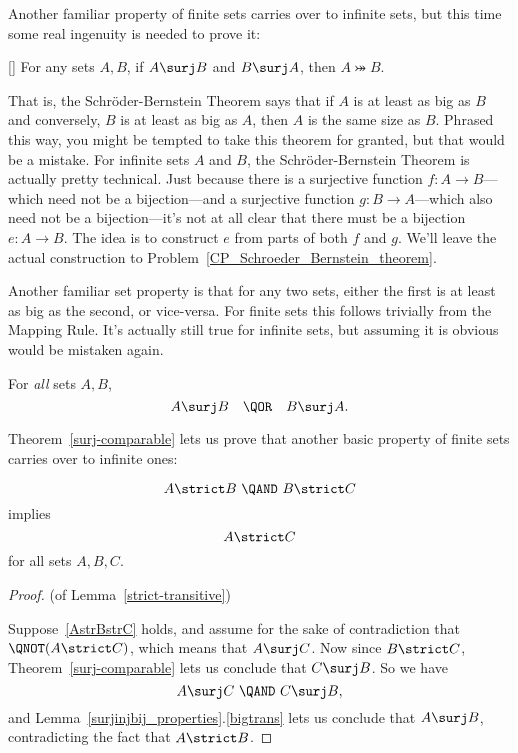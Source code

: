 Another familiar property of finite sets carries over to infinite
sets, but this time some real ingenuity is needed to prove it:
\begin{theorem}\label{S-B_thm} \mbox{}
 [] For any sets $A,B$, if $A \surj B$ and
 $B \surj A$, then $A \bij B$.
\end{theorem}

That is, the Schr\"oder-Bernstein Theorem says that if $A$ is at least
as big as $B$ and conversely, $B$ is at least as big as $A$, then $A$
is the same size as $B$.  Phrased this way, you might be tempted to
take this theorem for granted, but that would be a mistake.  For
infinite sets $A$ and $B$, the Schr\"oder-Bernstein Theorem is
actually pretty technical.  Just because there is a surjective
function $f:A\to B$---which need not be a bijection---and a surjective
function $g:B \to A$---which also need not be a bijection---it's not
at all clear that there must be a bijection $e:A \to B$.  The idea is
to construct $e$ from parts of both $f$ and $g$.  We'll leave the
actual construction to Problem~\ref{CP_Schroeder_Bernstein_theorem}.

Another familiar set property is that for any two sets, either the
first is at least as big as the second, or vice-versa.  For finite
sets this follows trivially from the Mapping Rule.  It's actually
still true for infinite sets, but assuming it is obvious would be
mistaken again.
  \begin{theorem}\label{surj-comparable}
    For \emph{all} sets $A,B$,
    \[
    A \surj B\quad \QOR\quad  B \surj A.
    \]
  \end{theorem}

Theorem~\ref{surj-comparable} lets us prove that another basic
property of finite sets carries over to infinite ones:
\begin{lemma}\label{strict-transitive}
\begin{equation}\label{AstrBstrC}
A \strict B\ \QAND\ B \strict C
\end{equation}
implies
\[
A \strict C
\]
for all sets $A,B,C$.
\end{lemma}

\begin{proof} (of Lemma~\ref{strict-transitive})

Suppose~\ref{AstrBstrC} holds, and assume for the sake of
contradiction that $\QNOT(A \strict C)$, which means that $A \surj C$.
Now since $B \strict C$, Theorem~\ref{surj-comparable} lets us
conclude that $C \surj B$.  So we have
\[
A \surj C\ \QAND\ C \surj B,
\]
and Lemma~\ref{surjinjbij_properties}.\ref{bigtrans} lets us conclude
that $A \surj B$, contradicting the fact that $A \strict B$.
\end{proof}

